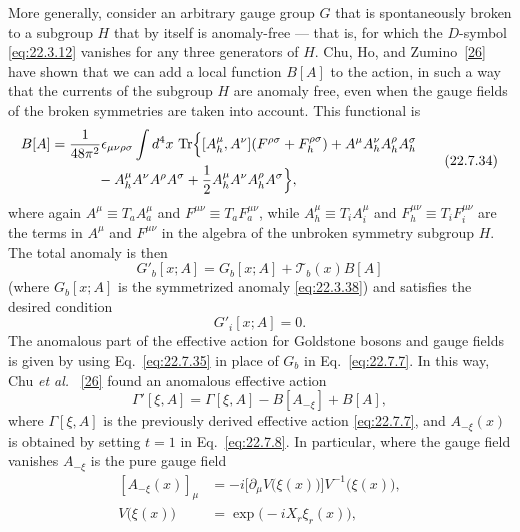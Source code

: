 More generally, consider an arbitrary gauge group $G$ that is
spontaneously broken to a subgroup $H$ that by itself is anomaly-free
--- that is, for which the $D$-symbol \eqref{eq:22.3.12} vanishes for any
three generators of $H$. Chu, Ho, and Zumino~\hyperref[ch22-ref-26]{[26]}
have shown that we can add a local function $B[A]$ to the action, in such
a way that the currents of the subgroup $H$ are anomaly free, even when
the gauge fields of the broken symmetries are taken into account. This
functional is
\begin{equation}
 \begin{aligned}
 B[A]
 ={}&\frac{1}{48\pi^2}\epsilon_{\mu\nu\rho\sigma}\int d^4x\,
 \operatorname{Tr}\Bigl\{
 [A_h^\mu,A^\nu](F^{\rho\sigma}+F_h^{\rho\sigma})
 +A^\mu A_h^\nu A_h^\rho A_h^\sigma
 \\
 &\qquad{}
 -A_h^\mu A^\nu A^\rho A^\sigma
 +\frac{1}{2}A_h^\mu A^\nu A_h^\rho A^\sigma
 \Bigr\},
 \end{aligned}
 \tag{22.7.34}\label{eq:22.7.34}
\end{equation}
where again $A^\mu\equiv T_a A_a^\mu$ and
$F^{\mu\nu}\equiv T_a F_a^{\mu\nu}$, while
$A_h^\mu\equiv T_iA_i^\mu$ and $F_h^{\mu\nu}\equiv T_iF_i^{\mu\nu}$ are
the terms in $A^\mu$ and $F^{\mu\nu}$ in the algebra of the unbroken
symmetry subgroup $H$. The total anomaly is then
\begin{equation}
 G'_b[x;A]
 =G_b[x;A]+\mathcal T_b(x)B[A]
 \tag{22.7.35}\label{eq:22.7.35}
\end{equation}
(where $G_b[x;A]$ is the symmetrized anomaly
\eqref{eq:22.3.38}) and satisfies the desired condition
\begin{equation}
 G'_i[x;A]=0.
 \tag{22.7.36}\label{eq:22.7.36}
\end{equation}
The anomalous part of the effective action for Goldstone bosons and gauge
fields is given by using Eq.~\eqref{eq:22.7.35} in place of $G_b$ in
Eq.~\eqref{eq:22.7.7}. In this way, Chu \emph{et al.}~%
\hyperref[ch22-ref-26]{[26]} found an anomalous effective action
\begin{equation}
 \Gamma'[\xi,A]
 =\Gamma[\xi,A]-B[A_{-\xi}]+B[A],
 \tag{22.7.37}\label{eq:22.7.37}
\end{equation}
where $\Gamma[\xi,A]$ is the previously derived effective action
\eqref{eq:22.7.7}, and $A_{-\xi}(x)$ is obtained by setting $t=1$ in
Eq.~\eqref{eq:22.7.8}. In particular, where the gauge field vanishes
$A_{-\xi}$ is the pure gauge field
\[
 \begin{aligned}
 [A_{-\xi}(x)]_\mu
 &=-i\bigl[\partial_\mu V\bigl(\xi(x)\bigr)\bigr]
 V^{-1}\bigl(\xi(x)\bigr),
 \\
 V\bigl(\xi(x)\bigr)
 &=\exp\bigl(-iX_r\xi_r(x)\bigr),
 \end{aligned}
\]
